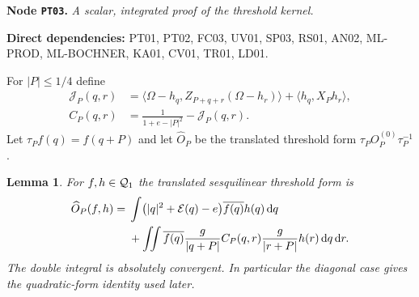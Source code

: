 \documentclass[11pt,a4paper]{article}
\newtheorem{lemma}[theorem]{Lemma}
\theoremstyle{remark}\newtheorem{remark}[theorem]{Remark}
\newcommand{\ip}[2]{\langle #1,#2\rangle}\newcommand{\norm}[1]{\lVert #1\rVert}
\newcommand{\abs}[1]{\lvert #1\rvert}\newcommand{\rankone}[2]{\lvert #1\rangle\langle #2\rvert}
\newcommand{\dd}{\,\mathrm d}\newcommand{\almosteverywhere}{\text{a.e.}}
\newcommand{\node}[3]{\par\Needspace{6\baselineskip}\smallskip\hypertarget{node:#1}{}\label{nodepage:#1}\noindent\textbf{Node \texttt{#1}.} \textit{#2.}\par\noindent\textbf{Direct dependencies:} #3.\par}
\newcommand{\Ecal}{\mathcal E}
\begin{document}
\node{PT03}{A scalar, integrated proof of the threshold kernel}{PT01, PT02, FC03, UV01, SP03, RS01, AN02, ML-PROD, ML-BOCHNER, KA01, CV01, TR01, LD01}
For $\abs P\leq1/4$ define
\begin{align}
 \mathcal J_P(q,r)
 &=\ip{\Omega-h_q}{Z_{P+q+r}(\Omega-h_r)}+\ip{h_q}{X_Ph_r},\\
 C_P(q,r)&=\frac1{1+e-\abs P^2}-\mathcal J_P(q,r).
 \label{eq:Ckernel}
\end{align}
Let $\tau_Pf(q)=f(q+P)$ and let $\widehat O_P$ be the translated threshold form $\tau_PO_P^{(0)}\tau_P^{-1}$.

\begin{lemma}\label{lem:kernelformula}
For $f,h\in\mathcal Q_1$ the translated sesquilinear threshold form is
\begin{align}
 \widehat O_P(f,h)
 ={}&\int\bigl(\abs q^2+\Ecal(q)-e\bigr)\overline{f(q)}h(q)\dd q\notag\\
 &+\iint\overline{f(q)}\frac g{\abs{q+P}}C_P(q,r)
                 \frac g{\abs{r+P}}h(r)\dd q\dd r.
 \label{eq:kernelformula}
\end{align}
The double integral is absolutely convergent. In particular the diagonal case gives the quadratic-form identity used later.
\end{lemma}
\end{document}
